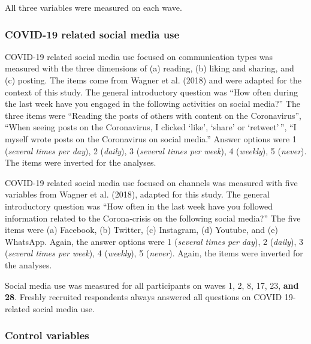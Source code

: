 \documentclass[
  man,mask]{apa7}
\begin{document}
All three variables were measured on each wave.

\hypertarget{covid-19-related-social-media-use}{%
\subsubsection{COVID-19 related social media use}\label{covid-19-related-social-media-use}}

COVID-19 related social media use focused on communication types was measured with the three dimensions of (a) reading, (b) liking and sharing, and (c) posting.
The items come from Wagner et al. (2018) and were adapted for the context of this study.
The general introductory question was ``How often during the last week have you engaged in the following activities on social media?''
The three items were ``Reading the posts of others with content on the Coronavirus'', ``When seeing posts on the Coronavirus, I clicked `like', `share' or `retweet'\,'', ``I myself wrote posts on the Coronavirus on social media.''
Answer options were 1 (\emph{several times per day}), 2 (\emph{daily}), 3 (\emph{several times per week}), 4 (\emph{weekly}), 5 (\emph{never}).
The items were inverted for the analyses.

COVID-19 related social media use focused on channels was measured with five variables from Wagner et al. (2018), adapted for this study.
The general introductory question was ``How often in the last week have you followed information related to the Corona-crisis on the following social media?''
The five items were (a) Facebook, (b) Twitter, (c) Instagram, (d) Youtube, and (e) WhatsApp.
Again, the answer options were 1 (\emph{several times per day}), 2 (\emph{daily}), 3 (\emph{several times per week}), 4 (\emph{weekly}), 5 (\emph{never}).
Again, the items were inverted for the analyses.

Social media use was measured for all participants on waves 1, 2, 8, 17, 23, \textbf{and 28}.
Freshly recruited respondents always answered all questions on COVID 19-related social media use.

\hypertarget{control-variables}{%
\subsubsection{Control variables}\label{control-variables}}
\end{document}
